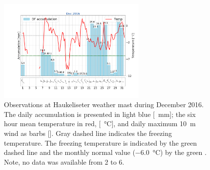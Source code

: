 \begin{figure}[!b]
	\centering
	\includegraphics[trim={4.cm 3.3cm 1.5cm 3.cm},clip,
	width=0.65\textwidth]{./fig_weathermast/T_P_U_201612}
	\caption{Observations at Haukeliseter weather mast during December 2016. 
    The daily accumulation is presented in light blue [\SI{}{\mm}]; the six hour mean temperature in red, [\SI{}{\celsius}], and daily maximum \SI{10}{\metre} wind as barbs [\SI{}{\mPs}]. Gray dashed line indicates the freezing temperature. The freezing temperature is indicated by the green dashed line and the monthly normal value (\SI{-6.0}{\celsius}) by the green \citep{eklima_norwegian_2016}. Note, no data was available from \num{2} to \SI{6}{\dec}.} \label{fig:DecObs}
\end{figure}
